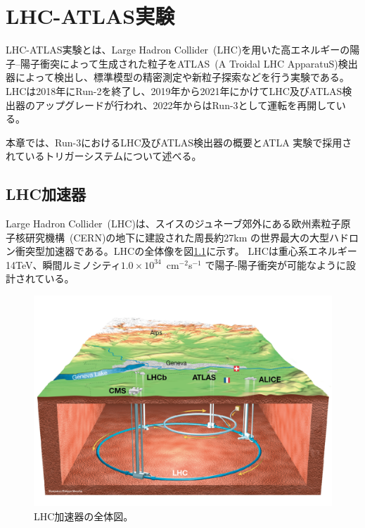 \chapter{LHC-ATLAS実験}\label{chapter2}
\label{chapter2}

LHC-ATLAS実験とは、Large Hadron Collider~(LHC)\cite{article:LHC}を用いた高エネルギーの陽子–陽子衝突によって生成された粒子をATLAS~(A Troidal LHC ApparatuS)検出器によって検出し、標準模型の精密測定や新粒子探索などを行う実験である\cite{article:ATLAS}。
LHCは2018年にRun-2を終了し、2019年から2021年にかけてLHC及びATLAS検出器のアップグレード\cite{article:phase-1}が行われ、2022年からはRun-3として運転を再開している。

本章では、Run-3におけるLHC及びATLAS検出器の概要とATLA 実験で採用されているトリガーシステムについて述べる。

\section{LHC加速器}
\label{section2-1}
Large Hadron Collider~(LHC)は、スイスのジュネーブ郊外にある欧州素粒子原子核研究機構~(CERN)\cite{article:CERN}の地下に建設された周長約27km の世界最大の大型ハドロン衝突型加速器である。LHCの全体像を図\ref{fig:LHC_overview}に示す\cite{article:Overall_view_LHC}。
LHCは重心系エネルギー14TeV、瞬間ルミノシティ$1.0\times10^{34}$~cm$^{-2}$s$^{-1}$ で陽子-陽子衝突が可能なように設計されている。

\begin{figure}[tb]
  \centering
  \includegraphics[clip, width=14cm]{fig/2/LHC_overview.pdf}
  \caption{LHC加速器の全体図\cite{article:Overall_view_LHC}。}
  \label{fig:LHC_overview}
\end{figure}

